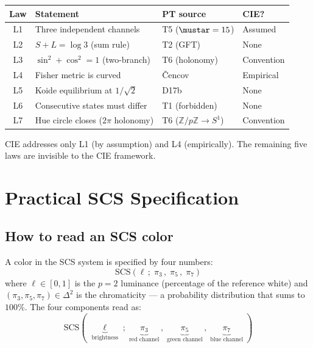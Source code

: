 \documentclass[12pt,a4paper]{article}
\begin{document}
\begin{center}
\begin{tabular}{clll}
\toprule
\textbf{Law} & \textbf{Statement} & \textbf{PT source} & \textbf{CIE?} \\
\midrule
L1 & Three independent channels & T5 ($\mustar = 15$) & Assumed \\
L2 & $S + L = \log 3$ (sum rule) & T2 (GFT) & None \\
L3 & $\sin^2 + \cos^2 = 1$ (two-branch) & T6 (holonomy) & Convention \\
L4 & Fisher metric is curved & \v{C}encov & Empirical \\
L5 & Koide equilibrium at $1/\sqrt{2}$ & D17b & None \\
L6 & Consecutive states must differ & T1 (forbidden) & None \\
L7 & Hue circle closes ($2\pi$ holonomy) & T6 ($\mathbb{Z}/p\mathbb{Z} \to S^1$) & Convention \\
\bottomrule
\end{tabular}
\end{center}

CIE addresses only L1 (by assumption) and L4 (empirically). The
remaining five laws are invisible to the CIE framework.

\section{Practical SCS Specification}
\label{sec:practical}

\subsection{How to read an SCS color}

A color in the SCS system is specified by four numbers:
\begin{equation}
  \mathrm{SCS}(\ell\,;\; \pi_3\,,\; \pi_5\,,\; \pi_7)
\end{equation}
where $\ell \in [0,1]$ is the $p=2$ luminance (percentage of the
reference white) and $(\pi_3, \pi_5, \pi_7) \in \Delta^2$ is the
chromaticity --- a probability distribution that sums to $100\%$.
The four components read as:
\[
  \mathrm{SCS}(\;\underbrace{\ell}_{\text{brightness}}\;;\;
  \underbrace{\pi_3}_{\text{red channel}}\,,\;
  \underbrace{\pi_5}_{\text{green channel}}\,,\;
  \underbrace{\pi_7}_{\text{blue channel}}\;)
\]
\end{document}
